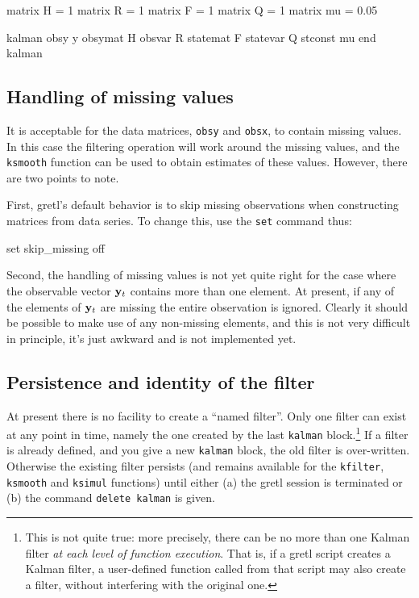\begin{code}
matrix H = {1}
matrix R = {1}
matrix F = {1}
matrix Q = {1}
matrix mu = {0.05}

kalman 
  obsy y
  obsymat H
  obsvar R
  statemat F
  statevar Q
  stconst mu
end kalman
\end{code} 

\subsection{Handling of missing values}

It is acceptable for the data matrices, \texttt{obsy} and
\texttt{obsx}, to contain missing values.  In this case the filtering
operation will work around the missing values, and the \texttt{ksmooth}
function can be used to obtain estimates of these values.  However,
there are two points to note.

First, gretl's default behavior is to skip missing observations when
constructing matrices from data series.  To change this, use the \texttt{set} 
command thus:
%
\begin{code}
set skip_missing off
\end{code}

Second, the handling of missing values is not yet quite right for the
case where the observable vector $\mathbf{y}_t$ contains more than one
element.  At present, if any of the elements of $\mathbf{y}_t$ are
missing the entire observation is ignored.  Clearly it should be
possible to make use of any non-missing elements, and this is not
very difficult in principle, it's just awkward and is not
implemented yet.

\subsection{Persistence and identity of the filter}

At present there is no facility to create a ``named filter''.  Only
one filter can exist at any point in time, namely the one created by
the last \texttt{kalman} block.\footnote{This is not quite true: more
  precisely, there can be no more than one Kalman filter \textit{at
    each level of function execution}.  That is, if a gretl script
  creates a Kalman filter, a user-defined function called from that
  script may also create a filter, without interfering with the
  original one.}  If a filter is already defined, and you give a new
\texttt{kalman} block, the old filter is over-written.  Otherwise the
existing filter persists (and remains available for the
\texttt{kfilter}, \texttt{ksmooth} and \texttt{ksimul} functions)
until either (a) the gretl session is terminated or (b) the command
\texttt{delete kalman} is given.


